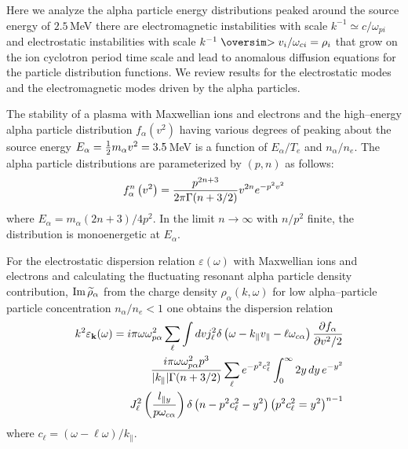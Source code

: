 \documentclass[a4paper,openany,12pt]{report}
\def\nms{\mathsurround=0pt}
\def\gtsim{\mathrel{\mathpalette\oversim>}} %
\def\oversim#1#2{\lower 2pt\vbox{\baselineskip 0pt \lineskip 1pt
    \ialign{$\nms#1\hfil##\hfil$\crcr#2\crcr\sim\crcr}}}
\begin{document}
Here we analyze the alpha particle energy distributions peaked around the source energy of $2.5\,$MeV there are electromagnetic instabilities with scale $k^{-1}\simeq c/\omega_{pi}$ and electrostatic instabilities with scale $k^{-1}\gtsim v_i/\omega_{ci}=\rho_i$ that grow on the ion cyclotron period time scale and lead to anomalous diffusion equations for the particle distribution functions. We review results for the electrostatic modes and the electromagnetic modes driven by the alpha particles. 

The stability of a plasma with Maxwellian ions and electrons and the high--energy alpha particle distribution 
$f_\alpha(v^2)$ having various degrees of peaking about the source energy $E_\alpha = {1\over 2} m_\alpha v^2 = 3.5\,$MeV is a function of $E_\alpha/T_e$ and $n_\alpha/n_e$. The alpha particle distributions are parameterized by $(p,n)$ as follows: 
\begin{equation}
f_\alpha^n\left(v^2\right)={p^{2n+3}\over 2\pi\Gamma(n+3/2)}v^{2n} e^{-p^2 v^2}\label{E7.1}
\end{equation}
where $E_\alpha=m_\alpha(2n+3)/4p^2$. In the limit $n\to\infty$ with $n/p^2$ finite, the distribution is monoenergetic at $E_\alpha$. 

For the electrostatic dispersion relation $\varepsilon(\omega)$ with Maxwellian ions and electrons and calculating the fluctuating resonant alpha particle density contribution, $\rm Im\,\widetilde\rho_\alpha$ from the charge density $\rho_\alpha(k,\omega)$ for low alpha--particle particle concentration $n_\alpha/n_e < 1$ one obtains the dispersion relation 
\begin{eqnarray}
&&k^2\varepsilon_{\mathbf{k}}(\omega)=i\pi\omega\omega^2_{p\alpha}\sum_\ell\int dv j^2_\ell\delta\left(\omega-k_\| v_\|-\ell\omega_{c\alpha}\right){\partial f_\alpha\over\partial v^2/2}\nonumber\\
&&\mbox{}\quad {i\pi\omega\omega^2_{p\alpha} p^3\over|k_\||\Gamma(n+3/2)}\sum_\ell e^{-p^2 c^2_\ell}\int_0^\infty 2y\, dy\, e^{-y^2}\nonumber\\
&&J^2_\ell\left({l_{\|y}\over p\omega_{c\alpha}}\right)\delta\left(n-p^2 c^2_\ell-y^2\right)\left(p^2 c^2_\ell=y^2\right)^{n-1}\label{E7.2}
\end{eqnarray}
where $c_\ell=(\omega-\ell\omega)/k_\|$.
\end{document}
